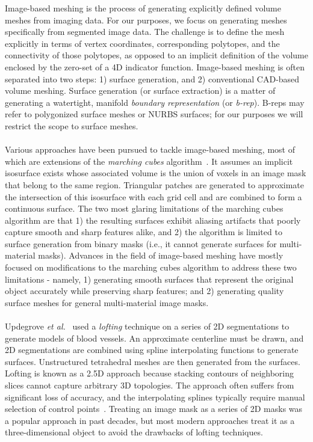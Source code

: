 %
Image-based meshing is the process of generating explicitly defined volume meshes from imaging data. For our purposes, we focus on generating meshes specifically from segmented image data. The challenge is to define the mesh explicitly in terms of vertex coordinates, corresponding polytopes, and the connectivity of those polytopes, as opposed to an implicit definition of the volume enclosed by the zero-set of a 4D indicator function. Image-based meshing is often separated into two steps: 1) surface generation, and 2) conventional CAD-based volume meshing. Surface generation (or surface extraction) is a matter of generating a watertight, manifold \textit{boundary representation} (or \textit{b-rep}). B-reps may refer to polygonized surface meshes or NURBS surfaces; for our purposes we will restrict the scope to surface meshes. \\ \\
%
Various approaches have been pursued to tackle image-based meshing, most of which are extensions of the \textit{marching cubes} algorithm~\cite{lorensen_1987}. It assumes an implicit isosurface exists whose associated volume is the union of voxels in an image mask that belong to the same region. Triangular patches are generated to approximate the intersection of this isosurface with each grid cell and are combined to form a continuous surface. The two most glaring limitations of the marching cubes algorithm are that 1) the resulting surfaces exhibit aliasing artifacts that poorly capture smooth and sharp features alike, and 2) the algorithm is limited to surface generation from binary masks (i.e., it cannot generate surfaces for multi-material masks). Advances in the field of image-based meshing have mostly focused on modifications to the marching cubes algorithm to address these two limitations - namely, 1) generating smooth surfaces that represent the original object accurately while preserving sharp features; and 2) generating quality surface meshes for general multi-material image masks. \\ \\ 
%
Updegrove \textit{et al.}~\cite{updegrove_2016} used a \textit{lofting} technique on a series of 2D segmentations to generate models of blood vessels. An approximate centerline must be drawn, and 2D segmentations are combined using spline interpolating functions to generate surfaces. Unstructured tetrahedral meshes are then generated from the surfaces. Lofting is known as a 2.5D approach because stacking contours of neighboring slices cannot capture arbitrary 3D topologies. The approach often suffers from significant loss of accuracy, and the interpolating splines typically require manual selection of control points~\cite{young_2008}. Treating an image mask as a series of 2D masks was a popular approach in past decades, but most modern approaches treat it as a three-dimensional object to avoid the drawbacks of lofting techniques. \\ \\
